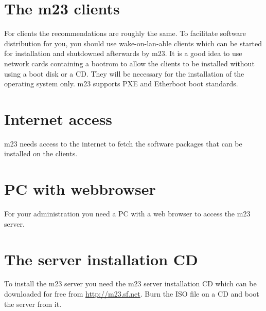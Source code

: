\section{The m23 clients}
For clients the recommendations are roughly the same. To facilitate software distribution for you, you should use wake-on-lan-able clients which can be started for installation and shutdowned afterwards by m23. It is a good idea to use network cards containing a bootrom to allow the clients to be installed without using a boot disk or a CD. They will be necessary for the installation of the operating system only. m23 supports PXE and Etherboot boot standards.

\section{Internet access}
m23 needs access to the internet to fetch the software packages that can be installed on the clients.

\section{PC with webbrowser}
For your administration you need a PC with a web browser to access the m23 server.

\section{The server installation CD}
To install the m23 server you need the m23 server installation CD which can be downloaded for free from  \underline{http://m23.sf.net}. Burn the ISO file on a CD and boot the server from it.